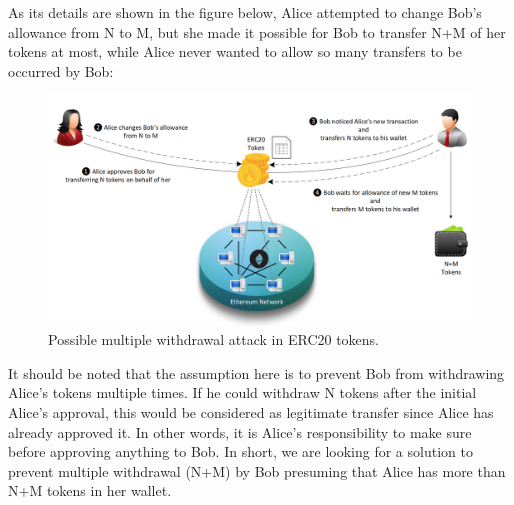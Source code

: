 As its details are shown in the figure below, Alice attempted to change Bob’s allowance from N to M, but she made it possible for Bob to transfer N+M of her tokens at most, while Alice never wanted to allow so many transfers to be occurred by Bob:
\begin{figure}[H]
	\includegraphics[width=1.0\linewidth]{figures/multiple_withdrawal_02.png}
	\caption{Possible multiple withdrawal attack in ERC20 tokens.}
\end{figure}
It should be noted that the assumption here is to prevent Bob from withdrawing Alice’s tokens multiple times. If he could withdraw N tokens after the initial Alice’s approval, this would be considered as legitimate transfer since Alice has already approved it. In other words, it is Alice’s responsibility to make sure before approving anything to Bob. In short, we are looking for a solution to prevent multiple withdrawal (N+M) by Bob presuming that Alice has more than N+M tokens in her wallet.
